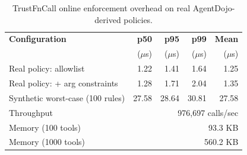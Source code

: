 \begin{table}[t]
\centering
\caption{TrustFnCall online enforcement overhead on real AgentDojo-derived policies.}
\label{tab:system-primary}
\small
\begin{tabular}{lrrrr}
\toprule
\textbf{Configuration} & \textbf{p50} & \textbf{p95} & \textbf{p99} & \textbf{Mean} \\
 & ($\mu$s) & ($\mu$s) & ($\mu$s) & ($\mu$s) \\
\midrule
Real policy: allowlist & 1.22 & 1.41 & 1.64 & 1.25 \\
Real policy: + arg constraints & 1.28 & 1.71 & 2.04 & 1.35 \\
Synthetic worst-case (100 rules) & 27.58 & 28.64 & 30.81 & 27.58 \\
\midrule
Throughput & \multicolumn{4}{r}{976,697 calls/sec} \\
Memory (100 tools) & \multicolumn{4}{r}{93.3 KB} \\
Memory (1000 tools) & \multicolumn{4}{r}{560.2 KB} \\
\bottomrule
\end{tabular}
\end{table}